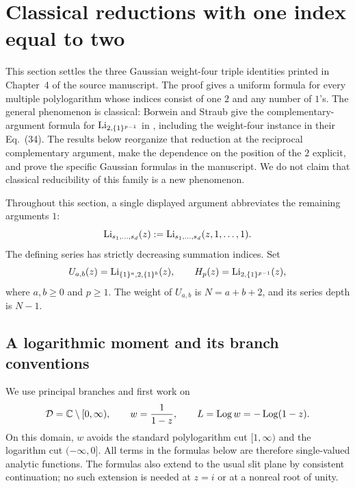 \section{Classical reductions with one index equal to two}
\label{recip:one2:sec:general}

This section settles the three Gaussian weight-four triple identities
printed in Chapter~4 of the source manuscript.  The proof gives a uniform
formula for every multiple polylogarithm whose indices consist of one
$2$ and any number of $1$'s.  The general phenomenon is classical:
Borwein and Straub give the complementary-argument formula for
$\operatorname{Li}_{2,\{1\}^{p-1}}$ in \cite[Eq.~(33)]{gaussian:BorweinStraub2015}, including
the weight-four instance in their Eq.~(34).  The results below reorganize
that reduction at the reciprocal complementary argument, make the
dependence on the position of the $2$ explicit, and prove the specific
Gaussian formulas in the manuscript.  We do not claim that classical
reducibility of this family is a new phenomenon.

Throughout this section, a single displayed argument abbreviates the
remaining arguments $1$:
\[
 \operatorname{Li}_{s_1,\ldots,s_d}(z)
 :=\operatorname{Li}_{s_1,\ldots,s_d}(z,1,\ldots,1).
\]
The defining series has strictly decreasing summation indices.  Set
\[
 U_{a,b}(z)=\operatorname{Li}_{\{1\}^{a},2,\{1\}^{b}}(z),\qquad
 H_p(z)=\operatorname{Li}_{2,\{1\}^{p-1}}(z),
\]
where $a,b\ge0$ and $p\ge1$.  The weight of $U_{a,b}$ is
$N=a+b+2$, and its series depth is $N-1$.

\subsection{A logarithmic moment and its branch conventions}

We use principal branches and first work on
\[
 \mathcal D=\mathbb C\setminus[0,\infty),\qquad
 w=\frac1{1-z},\qquad L=\operatorname{Log} w=-\operatorname{Log}(1-z).
\]
On this domain, $w$ avoids the standard polylogarithm cut $[1,\infty)$
and the logarithm cut $(-\infty,0]$.  All terms in the formulas below
are therefore single-valued analytic functions.  The formulas also
extend to the usual slit plane by consistent continuation; no such
extension is needed at $z=i$ or at a nonreal root of unity.

